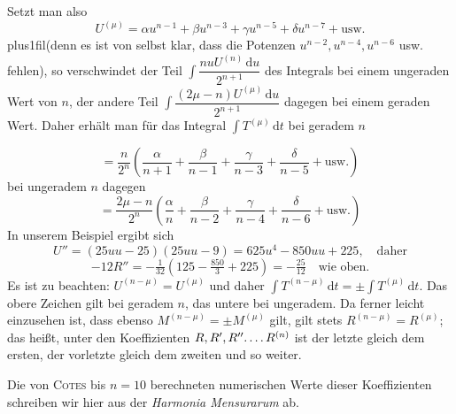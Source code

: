 Setzt man also
\[
U^{(\mu)}=\alpha u^{n-1}+\beta u^{n-3}+\gamma u^{n-5}+\delta u^{n-7}+\text{usw.}
\]
\begingroup\rightskip=0pt plus1fil\relax\noindent (denn es ist von selbst klar, dass die Potenzen $u^{n-2},\allowbreak u^{n-4},\allowbreak u^{n-6}$ usw. fehlen), so verschwindet der Teil $\int\dfrac{nuU^{(n)}\,\mathrm{d}u}{2^{n+1}}$ des Integrals bei einem ungeraden Wert von $n$, der andere Teil $\int\dfrac{(2\mu-n)U^{(\mu)}\,\mathrm{d}u}{2^{n+1}}$ dagegen bei einem geraden Wert. Daher erhält man für das Integral $\int T^{(\mu)}\,\mathrm{d}t$ bei geradem $n$\par\endgroup
\[
=\frac{n}{2^n}\left(\frac{\alpha}{n+1}+\frac{\beta}{n-1}+\frac{\gamma}{n-3}+\frac{\delta}{n-5}+\text{usw.}\right)
\]
bei ungeradem $n$ dagegen
\[
=\frac{2\mu-n}{2^n}\left(\frac{\alpha}{n}+\frac{\beta}{n-2}+\frac{\gamma}{n-4}+\frac{\delta}{n-6}+\text{usw.}\right)
\]
In unserem Beispiel ergibt sich
\[
U''=(25uu-25)(25uu-9)=625u^4-850uu+225,\quad\text{daher}
\]
\[
-12R''=-\tfrac1{32}\left(125-\tfrac{850}{3}+225\right)=-\tfrac{25}{12}\quad\text{wie oben.}
\]
Es ist zu beachten: $U^{(n-\mu)}=U^{(\mu)}$ und daher $\int T^{(n-\mu)}\,\mathrm{d}t=\pm\int T^{(\mu)}\,\mathrm{d}t$. Das obere Zeichen gilt bei geradem $n$, das untere bei ungeradem. Da ferner leicht einzusehen ist, dass ebenso $M^{(n-\mu)}=\pm M^{(\mu)}$ gilt, gilt stets $R^{(n-\mu)}=R^{(\mu)}$; das heißt, unter den Koeffizienten $R,R',R''\ldotp\ldotp\ldotp\ldotp R^{(n)}$ ist der letzte gleich dem ersten, der vorletzte gleich dem zweiten und so weiter.

Die von \textsc{Cotes} bis $n=10$ berechneten numerischen Werte dieser Koeffizienten schreiben wir hier aus der \textit{Harmonia Mensurarum} ab.

